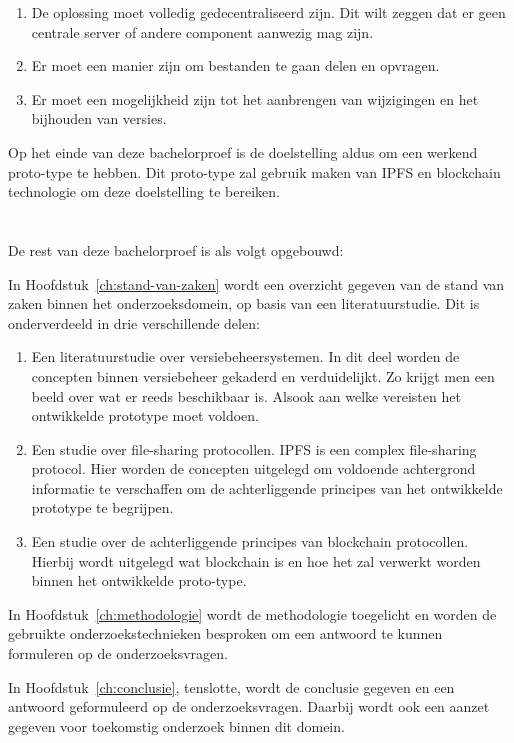\begin{enumerate}
 \item De oplossing moet volledig gedecentraliseerd zijn. Dit wilt zeggen dat er geen centrale server of andere component aanwezig mag zijn.\\
 \item Er moet een manier zijn om bestanden te gaan delen en opvragen.\\
 \item Er moet een mogelijkheid zijn tot het aanbrengen van wijzigingen en het bijhouden van versies.
\end{enumerate}

Op het einde van deze bachelorproef is de doelstelling aldus om een werkend proto-type te hebben. Dit proto-type zal gebruik maken van IPFS en blockchain technologie om deze doelstelling te bereiken.

\section{}
\label{sec:opzet-bachelorproef}

De rest van deze bachelorproef is als volgt opgebouwd:

In Hoofdstuk~\ref{ch:stand-van-zaken} wordt een overzicht gegeven van de stand van zaken binnen het onderzoeksdomein, op basis van een literatuurstudie. Dit is onderverdeeld in drie verschillende delen:

\begin{enumerate}
\item Een literatuurstudie over versiebeheersystemen. In dit deel worden de  concepten binnen versiebeheer gekaderd en verduidelijkt. Zo krijgt men een beeld over wat er reeds beschikbaar is. Alsook aan welke vereisten het ontwikkelde prototype moet voldoen.\\
\item Een studie over file-sharing protocollen. IPFS is een complex file-sharing protocol. Hier worden de concepten uitgelegd om voldoende achtergrond informatie te verschaffen om de achterliggende principes van het ontwikkelde prototype te begrijpen.\\
\item Een studie over de achterliggende principes van blockchain protocollen. Hierbij wordt uitgelegd wat blockchain is en hoe het zal verwerkt worden binnen het ontwikkelde proto-type.
\end{enumerate}

In Hoofdstuk~\ref{ch:methodologie} wordt de methodologie toegelicht en worden de gebruikte onderzoekstechnieken besproken om een antwoord te kunnen formuleren op de onderzoeksvragen.

In Hoofdstuk~\ref{ch:conclusie}, tenslotte, wordt de conclusie gegeven en een antwoord geformuleerd op de onderzoeksvragen. Daarbij wordt ook een aanzet gegeven voor toekomstig onderzoek binnen dit domein.
